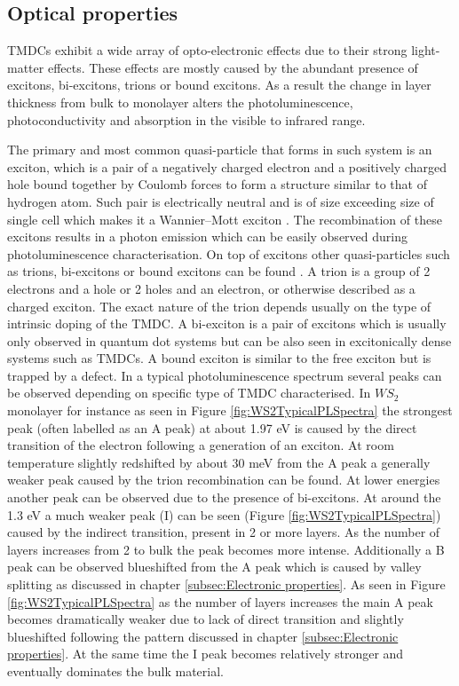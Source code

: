 	
\subsection{Optical properties}
\label{subsec:Optical properties}

TMDCs exhibit a wide array of opto-electronic effects due to their strong light-matter effects. These effects are mostly caused by the abundant presence of excitons, bi-excitons, trions or bound excitons. As a result the change in layer thickness from bulk to monolayer alters the photoluminescence, photoconductivity and absorption in the visible to infrared range.
		
The primary and most common quasi-particle that forms in such system is an exciton, which is a pair of a negatively charged electron and a positively charged hole bound together by Coulomb forces to form a structure similar to that of hydrogen atom. Such pair is electrically neutral and is of size exceeding size of single cell which makes it a Wannier–Mott exciton \cite{Ye2014}. The recombination of these excitons results in a photon emission which can be easily observed during photoluminescence characterisation. On top of excitons other quasi-particles such as trions, bi-excitons or bound excitons can be found \cite{Plechinger2015}. A trion is a group of 2 electrons and a hole or 2 holes and an electron, or otherwise described as a charged exciton. The exact nature of the trion depends usually on the type of intrinsic doping of the TMDC. A bi-exciton is a pair of excitons which is usually only observed in quantum dot systems but can be also seen in excitonically dense systems such as TMDCs. A bound exciton is similar to the free exciton but is trapped by a defect. In a typical photoluminescence spectrum several peaks can be observed depending on specific type of TMDC characterised. In $WS_2$ monolayer for instance as seen in Figure \ref{fig:WS2TypicalPLSpectra} the strongest peak (often labelled as an A peak) at about 1.97 eV is caused by the direct transition of the electron following a generation of an exciton. At room temperature slightly redshifted by about 30 meV from the A peak a generally weaker peak caused by the trion recombination can be found. At lower energies another peak can be observed due to the presence of bi-excitons. At around the 1.3 eV a much weaker peak (I) can be seen (Figure \ref{fig:WS2TypicalPLSpectra}) caused by the indirect transition, present in 2 or more layers. As the number of layers increases from 2 to bulk the peak becomes more intense. Additionally a B peak can be observed blueshifted from the A peak which is caused by valley splitting as discussed in chapter \ref{subsec:Electronic properties}. As seen in Figure \ref{fig:WS2TypicalPLSpectra} as the number of layers increases the main A peak becomes dramatically weaker due to lack of direct transition and slightly blueshifted following the pattern discussed in chapter \ref{subsec:Electronic properties}. At the same time the I peak becomes relatively stronger and eventually dominates the bulk material.
		
